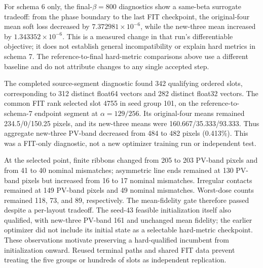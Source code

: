 \documentclass[conference]{IEEEtran}
\begin{document}
For schema 6 only, the final-$\beta=800$ diagnostics show a same-beta surrogate tradeoff: from the phase boundary to the last FIT checkpoint, the original-four mean soft loss decreased by $7.372981\times10^{-6}$, while the new-three mean increased by $1.343352\times10^{-6}$. This is a measured change in that run's differentiable objective; it does not establish general incompatibility or explain hard metrics in schema 7. The reference-to-final hard-metric comparisons above use a different baseline and do not attribute changes to any single accepted step.


The completed source-segment diagnostic found 342 qualifying ordered slots, corresponding to 312 distinct float64 vectors and 282 distinct float32 vectors. The common FIT rank selected slot 4755 in seed group 101, on the reference-to-schema-7 endpoint segment at $\alpha=129/256$. Its original-four means remained 234.5/0/150.25 pixels, and its new-three means were 160.667/35.333/93.333. Thus aggregate new-three PV-band decreased from 484 to 482 pixels (0.413\%). This was a FIT-only diagnostic, not a new optimizer training run or independent test.

At the selected point, finite ribbons changed from 205 to 203 PV-band pixels and from 41 to 40 nominal mismatches; asymmetric line ends remained at 130 PV-band pixels but increased from 16 to 17 nominal mismatches. Irregular contacts remained at 149 PV-band pixels and 49 nominal mismatches. Worst-dose counts remained 118, 73, and 89, respectively. The mean-fidelity gate therefore passed despite a per-layout tradeoff. The seed-43 feasible initialization itself also qualified, with new-three PV-band 161 and unchanged mean fidelity; the earlier optimizer did not include its initial state as a selectable hard-metric checkpoint. These observations motivate preserving a hard-qualified incumbent from initialization onward. Reused terminal paths and shared FIT data prevent treating the five groups or hundreds of slots as independent replication.
\end{document}
